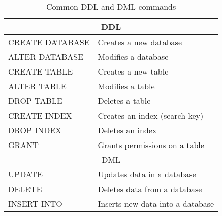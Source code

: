 \documentclass{article}
\begin{document}
\begin{table}

    \centering

    \begin{tabular}{ll}

        \toprule

        \multicolumn{2}{c}{DDL} \\

        \midrule

        CREATE DATABASE & Creates a new database \\
        
        ALTER DATABASE  & Modifies a database \\
        
        CREATE TABLE    & Creates a new table \\
        
        ALTER TABLE     & Modifies a table \\

        DROP TABLE      & Deletes a table \\
        
        CREATE INDEX    & Creates an index (search key) \\
        
        DROP INDEX      & Deletes an index \\
        
        GRANT           & Grants permissions on a table \\

        \midrule

        \multicolumn{2}{c}{DML} \\

        \midrule
        
        UPDATE          & Updates data in a database \\
        
        DELETE          & Deletes data from a database \\
        
        INSERT INTO     & Inserts new data into a database \\

        \bottomrule

    \end{tabular}

    \caption{Common DDL and DML commands}

\end{table}
\end{document}
